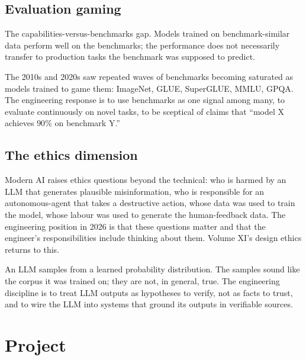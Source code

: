 \subsection{Evaluation gaming}

The capabilities-versus-benchmarks gap. Models trained on benchmark-similar data perform well on the benchmarks; the performance does not necessarily transfer to production tasks the benchmark was supposed to predict.

The 2010s and 2020s saw repeated waves of benchmarks becoming saturated as models trained to game them: ImageNet, GLUE, SuperGLUE, MMLU, GPQA. The engineering response is to use benchmarks as one signal among many, to evaluate continuously on novel tasks, to be sceptical of claims that ``model X achieves $90\%$ on benchmark Y.''

\subsection{The ethics dimension}

Modern AI raises ethics questions beyond the technical: who is harmed by an LLM that generates plausible misinformation, who is responsible for an autonomous-agent that takes a destructive action, whose data was used to train the model, whose labour was used to generate the human-feedback data. The engineering position in 2026 is that these questions matter and that the engineer's responsibilities include thinking about them. Volume XI's design ethics returns to this.

\begin{principle}
An LLM samples from a learned probability distribution. The samples sound like the corpus it was trained on; they are not, in general, true. The engineering discipline is to treat LLM outputs as hypotheses to verify, not as facts to trust, and to wire the LLM into systems that ground its outputs in verifiable sources.
\end{principle}

\section{Project}

